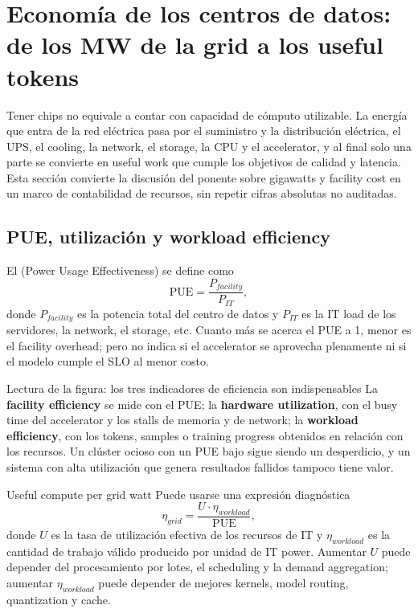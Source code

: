 \section{Economía de los centros de datos: de los MW de la grid a los useful tokens}

Tener chips no equivale a contar con capacidad de cómputo utilizable. La energía que entra de la red eléctrica pasa por el suministro y la distribución eléctrica, el UPS, el cooling, la network, el storage, la CPU y el accelerator, y al final solo una parte se convierte en useful work que cumple los objetivos de calidad y latencia. Esta sección convierte la discusión del ponente sobre gigawatts y facility cost en un marco de contabilidad de recursos, sin repetir cifras absolutas no auditadas.

\subsection{PUE, utilización y workload efficiency}

El  (Power Usage Effectiveness) se define como
\[
\mathrm{PUE}=\frac{P_{facility}}{P_{IT}},
\]
donde $P_{facility}$ es la potencia total del centro de datos y $P_{IT}$ es la IT load de los servidores, la network, el storage, etc. Cuanto más se acerca el PUE a 1, menor es el facility overhead; pero no indica si el accelerator se aprovecha plenamente ni si el modelo cumple el SLO al menor costo.


\begin{knowledgebox}{Lectura de la figura: los tres indicadores de eficiencia son indispensables}
La \textbf{facility efficiency} se mide con el PUE; la \textbf{hardware utilization}, con el busy time del accelerator y los stalls de memoria y de network; la \textbf{workload efficiency}, con los tokens, samples o training progress obtenidos en relación con los recursos. Un clúster ocioso con un PUE bajo sigue siendo un desperdicio, y un sistema con alta utilización que genera resultados fallidos tampoco tiene valor.
\end{knowledgebox}

\begin{importantbox}{Useful compute per grid watt}
Puede usarse una expresión diagnóstica
\[
\eta_{grid}=\frac{U\cdot \eta_{workload}}{\mathrm{PUE}},
\]
donde $U$ es la tasa de utilización efectiva de los recursos de IT y $\eta_{workload}$ es la cantidad de trabajo válido producido por unidad de IT power. Aumentar $U$ puede depender del procesamiento por lotes, el scheduling y la demand aggregation; aumentar $\eta_{workload}$ puede depender de mejores kernels, model routing, quantization y cache.
\end{importantbox}


